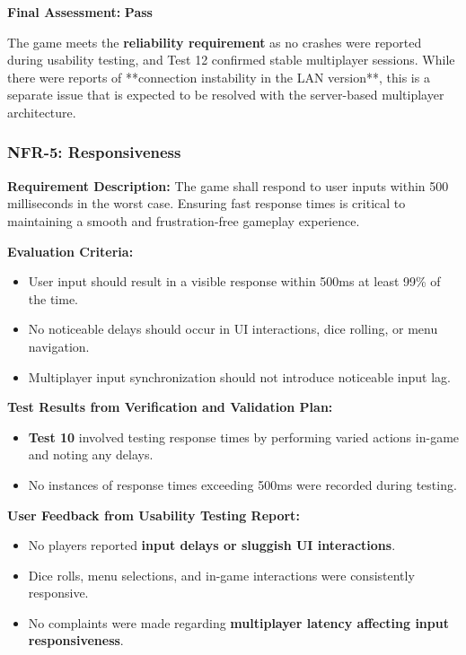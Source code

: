 \documentclass[12pt, titlepage]{article}
\begin{document}
\textbf{Final Assessment:} \textbf{Pass}  

The game meets the \textbf{reliability requirement} as no crashes were reported during usability testing, and Test 12 confirmed stable multiplayer sessions. While there were reports of **connection instability in the LAN version**, this is a separate issue that is expected to be resolved with the server-based multiplayer architecture.

\subsubsection{NFR-5: Responsiveness}

\textbf{Requirement Description:}  
The game shall respond to user inputs within 500 milliseconds in the worst case. Ensuring fast response times is critical to maintaining a smooth and frustration-free gameplay experience.

\textbf{Evaluation Criteria:}  
\begin{itemize}
    \item User input should result in a visible response within 500ms at least 99\% of the time.
    \item No noticeable delays should occur in UI interactions, dice rolling, or menu navigation.
    \item Multiplayer input synchronization should not introduce noticeable input lag.
\end{itemize}

\textbf{Test Results from Verification and Validation Plan:}  
\begin{itemize}
    \item \textbf{Test 10} involved testing response times by performing varied actions in-game and noting any delays.
    \item No instances of response times exceeding 500ms were recorded during testing.
\end{itemize}

\textbf{User Feedback from Usability Testing Report:}  
\begin{itemize}
    \item No players reported \textbf{input delays or sluggish UI interactions}.
    \item Dice rolls, menu selections, and in-game interactions were consistently responsive.
    \item No complaints were made regarding \textbf{multiplayer latency affecting input responsiveness}.
\end{itemize}
\end{document}
